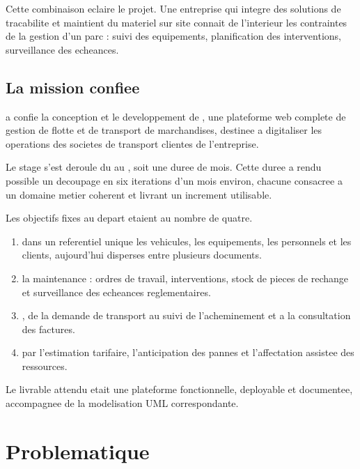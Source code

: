 Cette combinaison eclaire le projet. Une entreprise qui integre des
solutions de tracabilite et maintient du materiel sur site connait de
l'interieur les contraintes de la gestion d'un parc : suivi des
equipements, planification des interventions, surveillance des echeances.

\subsection{La mission confiee}

\entreprise{} a confie la conception et le developpement de
\essentiel{\sujetCourt}, une plateforme web complete de gestion de flotte
et de transport de marchandises, destinee a digitaliser les operations
des societes de transport clientes de l'entreprise.

Le stage s'est deroule du \stageDebut{} au \stageFin, soit une duree de
\stageDuree{} mois. Cette duree a rendu possible un decoupage en six
iterations d'un mois environ, chacune consacree a un domaine metier
coherent et livrant un increment utilisable.

Les objectifs fixes au depart etaient au nombre de quatre.

\begin{enumerate}
  \item {} dans un referentiel unique les vehicules,
    les equipements, les personnels et les clients, aujourd'hui disperses
    entre plusieurs documents.
  \item {} la maintenance : ordres de travail,
    interventions, stock de pieces de rechange et surveillance des
    echeances reglementaires.
  \item {}, de la
    demande de transport au suivi de l'acheminement et a la consultation
    des factures.
  \item {} par l'estimation tarifaire,
    l'anticipation des pannes et l'affectation assistee des ressources.
\end{enumerate}

Le livrable attendu etait une plateforme fonctionnelle, deployable et
documentee, accompagnee de la modelisation UML correspondante.

\section{Problematique}
\label{sec:problematique}

